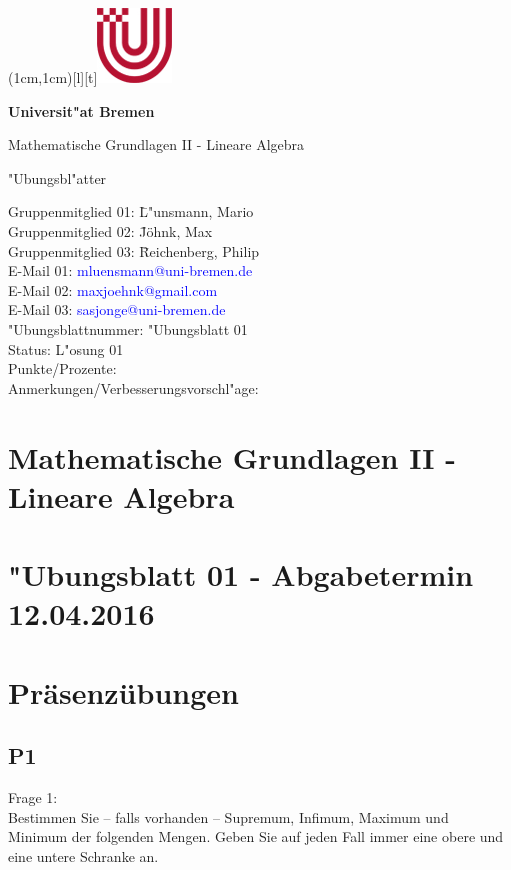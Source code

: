 \documentclass[12pt,a4paper]{article}
\newcommand\header{\textsf{\textbf{\Large \\}}}
\newcommand\headers{\textsf{\textbf{\Large \hspace{2.55cm} Universit"at Bremen}}}
\newcommand\headerf{\textsf{\large \hspace{2.6cm} Mathematische Grundlagen II - Lineare Algebra}}
\newcommand\headerg{\textsf{\large \hspace{2.6cm} "Ubungsbl"atter}}
\newcommand\FIG{\hspace{1.7cm}\includegraphics{Uni-Logo-new2.jpg}}
\begin{document}

\parpic(1cm,1cm)[l][t]{\FIG}
\header\par
\headers\par
\headerf\par
\headerg\par

\vspace{1.1cm}
\begin{flushleft}
\begin{tabbing}
Gruppenmitglied 01: \=L"unsmann, Mario\\[2ex]
Gruppenmitglied 02: \=Jöhnk, Max\\[2ex]
Gruppenmitglied 03: \=Reichenberg, Philip\\[2ex]
E-Mail 01: \>\textcolor{blue}{mluensmann@uni-bremen.de}\\[2ex]
E-Mail 02: \>\textcolor{blue}{maxjoehnk@gmail.com}\\[2ex]
E-Mail 03: \>\textcolor{blue}{sasjonge@uni-bremen.de}\\[2ex]
"Ubungsblattnummer: \>"Ubungsblatt 01\\[2ex]
Status: \>L"osung 01\\[8ex]
Punkte/Prozente:\\[16ex]
Anmerkungen/Verbesserungsvorschl"age:
\end{tabbing}
\end{flushleft}

\clearpage

\section*{Mathematische Grundlagen II - Lineare Algebra}

\section*{"Ubungsblatt 01 - Abgabetermin 12.04.2016}

\section{Präsenzübungen}

\subsection{P1}

Frage 1:
\\[2ex]
Bestimmen Sie – falls vorhanden – Supremum, Infimum, Maximum und Minimum der folgenden Mengen. Geben Sie auf jeden Fall immer eine obere und eine untere Schranke an.
\end{document}
